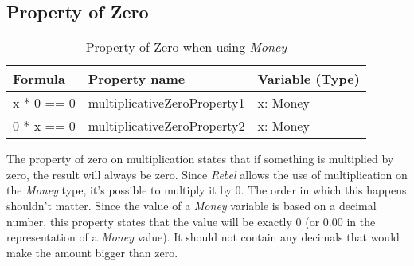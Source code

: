 \subsection*{Property of Zero}
\label{ssct:properties_propertyofzero}
\FloatBarrier
\begin{table}[!ht]
\centering
\begin{tabular}{lll}
\hline
                        \textbf{Formula} & \textbf{Property name}     & \textbf{Variable (Type)} \\ \hline
\rowcolor[HTML]{EFEFEF} x * 0 == 0       & multiplicativeZeroProperty1 & x: Money                 \\
                        0 * x == 0       & multiplicativeZeroProperty2 & x: Money                 \\ \hline
\end{tabular}
\caption{Property of Zero when using \textit{Money}}
\label{tbl:ch4_money_propertyzero}
\end{table}
\FloatBarrier
The property of zero on multiplication states that if something is multiplied
by zero, the result will always be zero. Since \textit{Rebel} allows the use of
multiplication on the \textit{Money} type, it's possible to multiply it by 0.
The order in which this happens shouldn't matter. Since the value of a
\textit{Money} variable is based on a decimal number, this property states that
the value will be exactly 0 (or 0.00 in the representation of a \textit{Money}
value). It should not contain any decimals that would make the amount bigger
than zero. 

